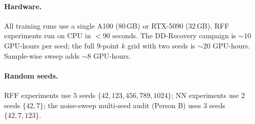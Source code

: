 \paragraph{Hardware.} All training runs use a single A100 (80\,GB) or RTX-5090 (32\,GB). RFF experiments run on CPU in $<\!90$ seconds. The DD-Recovery campaign is $\sim$$10$ GPU-hours per seed; the full $9$-point $k$ grid with two seeds is $\sim$$20$ GPU-hours. Sample-wise sweep adds $\sim$$8$ GPU-hours.

\paragraph{Random seeds.} RFF experiments use $5$ seeds $\{42, 123, 456, 789, 1024\}$; NN experiments use $2$ seeds $\{42, 7\}$; the noise-sweep multi-seed audit (Person B) uses $3$ seeds $\{42, 7, 123\}$.

